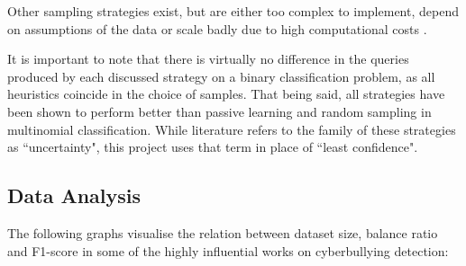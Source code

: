 \documentclass[a4paper,12pt]{article}
\begin{document}
Other sampling strategies exist, but are either too complex to implement, depend on assumptions of the data or scale badly due to high computational costs \cite{Kumar2020}.

It is important to note that there is virtually no difference in the queries produced by each discussed strategy on a binary classification problem, as all heuristics coincide in the choice of samples. That being said, all strategies have been shown to perform better than passive learning and random sampling in multinomial classification. While literature refers to the family of these strategies as ``uncertainty", this project uses that term in place of ``least confidence".
\newpage
\subsection{Data Analysis}
The following graphs visualise the relation between dataset size, balance ratio and F1-score in some of the highly influential works on cyberbullying detection:
\end{document}
